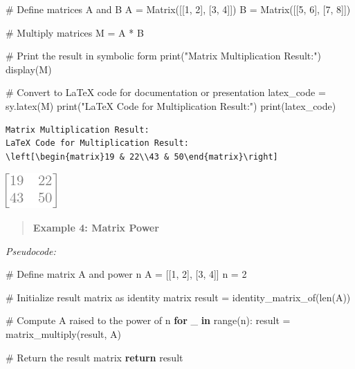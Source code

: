 \documentclass[
  letterpaper,
  DIV=11,
  numbers=noendperiod]{scrreprt}
\newenvironment{Shaded}{\begin{snugshade}}{\end{snugshade}}
\newcommand{\BuiltInTok}[1]{\textcolor[rgb]{0.00,0.23,0.31}{#1}}
\newcommand{\CommentTok}[1]{\textcolor[rgb]{0.37,0.37,0.37}{#1}}
\newcommand{\ControlFlowTok}[1]{\textcolor[rgb]{0.00,0.23,0.31}{\textbf{#1}}}
\newcommand{\DecValTok}[1]{\textcolor[rgb]{0.68,0.00,0.00}{#1}}
\newcommand{\KeywordTok}[1]{\textcolor[rgb]{0.00,0.23,0.31}{\textbf{#1}}}
\newcommand{\NormalTok}[1]{\textcolor[rgb]{0.00,0.23,0.31}{#1}}
\newcommand{\OperatorTok}[1]{\textcolor[rgb]{0.37,0.37,0.37}{#1}}
\newcommand{\StringTok}[1]{\textcolor[rgb]{0.13,0.47,0.30}{#1}}
\theoremstyle{plain}
\theoremstyle{definition}
\theoremstyle{remark}
\begin{document}
\begin{Shaded}
\begin{Highlighting}[]
\CommentTok{\# Define matrices A and B}
\NormalTok{A }\OperatorTok{=}\NormalTok{ Matrix([[}\DecValTok{1}\NormalTok{, }\DecValTok{2}\NormalTok{], [}\DecValTok{3}\NormalTok{, }\DecValTok{4}\NormalTok{]])}
\NormalTok{B }\OperatorTok{=}\NormalTok{ Matrix([[}\DecValTok{5}\NormalTok{, }\DecValTok{6}\NormalTok{], [}\DecValTok{7}\NormalTok{, }\DecValTok{8}\NormalTok{]])}

\CommentTok{\# Multiply matrices}
\NormalTok{M }\OperatorTok{=}\NormalTok{ A }\OperatorTok{*}\NormalTok{ B}

\CommentTok{\# Print the result in symbolic form}
\BuiltInTok{print}\NormalTok{(}\StringTok{"Matrix Multiplication Result:"}\NormalTok{)}
\NormalTok{display(M)}

\CommentTok{\# Convert to LaTeX code for documentation or presentation}
\NormalTok{latex\_code }\OperatorTok{=}\NormalTok{ sy.latex(M)}
\BuiltInTok{print}\NormalTok{(}\StringTok{"LaTeX Code for Multiplication Result:"}\NormalTok{)}
\BuiltInTok{print}\NormalTok{(latex\_code)}
\end{Highlighting}
\end{Shaded}

\begin{verbatim}
Matrix Multiplication Result:
LaTeX Code for Multiplication Result:
\left[\begin{matrix}19 & 22\\43 & 50\end{matrix}\right]
\end{verbatim}

\includegraphics{module_1_files/figure-pdf/cell-6-output-2.png}

\begin{quote}
\textbf{Example 4: Matrix Power}
\end{quote}

\emph{Pseudocode:}

\begin{Shaded}
\begin{Highlighting}[]
\CommentTok{\# Define matrix A and power n}
\NormalTok{A }\OperatorTok{=}\NormalTok{ [[}\DecValTok{1}\NormalTok{, }\DecValTok{2}\NormalTok{], [}\DecValTok{3}\NormalTok{, }\DecValTok{4}\NormalTok{]]}
\NormalTok{n }\OperatorTok{=} \DecValTok{2}

\CommentTok{\# Initialize result matrix as identity matrix}
\NormalTok{result }\OperatorTok{=}\NormalTok{ identity\_matrix\_of(}\BuiltInTok{len}\NormalTok{(A))}

\CommentTok{\# Compute A raised to the power of n}
\ControlFlowTok{for}\NormalTok{ \_ }\KeywordTok{in} \BuiltInTok{range}\NormalTok{(n):}
\NormalTok{    result }\OperatorTok{=}\NormalTok{ matrix\_multiply(result, A)}

\CommentTok{\# Return the result matrix}
\ControlFlowTok{return}\NormalTok{ result}
\end{Highlighting}
\end{Shaded}
\end{document}
